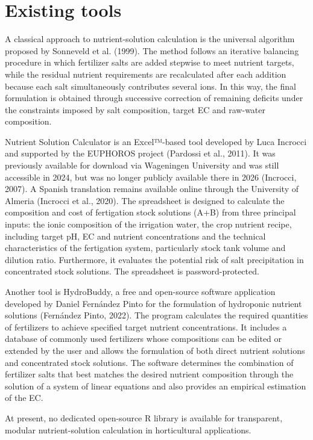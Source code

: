 \documentclass[
  letterpaper,
  DIV=11,
  numbers=noendperiod]{scrreprt}
\begin{document}
\section{Existing tools}\label{existing-tools}

A classical approach to nutrient-solution calculation is the universal
algorithm proposed by Sonneveld et al. (1999). The method follows an
iterative balancing procedure in which fertilizer salts are added
stepwise to meet nutrient targets, while the residual nutrient
requirements are recalculated after each addition because each salt
simultaneously contributes several ions. In this way, the final
formulation is obtained through successive correction of remaining
deficits under the constraints imposed by salt composition, target EC
and raw-water composition.

Nutrient Solution Calculator is an Excel™-based tool developed by Luca
Incrocci and supported by the EUPHOROS project (Pardossi et al., 2011).
It was previously available for download via Wageningen University and
was still accessible in 2024, but was no longer publicly available there
in 2026 (Incrocci, 2007). A Spanish translation remains available online
through the University of Almeria (Incrocci et al., 2020). The
spreadsheet is designed to calculate the composition and cost of
fertigation stock solutions (A+B) from three principal inputs: the ionic
composition of the irrigation water, the crop nutrient recipe, including
target pH, EC and nutrient concentrations and the technical
characteristics of the fertigation system, particularly stock tank
volume and dilution ratio. Furthermore, it evaluates the potential risk
of salt precipitation in concentrated stock solutions. The spreadsheet
is password-protected.

Another tool is HydroBuddy, a free and open-source software application
developed by Daniel Fernández Pinto for the formulation of hydroponic
nutrient solutions (Fernández Pinto, 2022). The program calculates the
required quantities of fertilizers to achieve specified target nutrient
concentrations. It includes a database of commonly used fertilizers
whose compositions can be edited or extended by the user and allows the
formulation of both direct nutrient solutions and concentrated stock
solutions. The software determines the combination of fertilizer salts
that best matches the desired nutrient composition through the solution
of a system of linear equations and also provides an empirical
estimation of the EC.

At present, no dedicated open-source R library is available for
transparent, modular nutrient-solution calculation in horticultural
applications.
\end{document}
